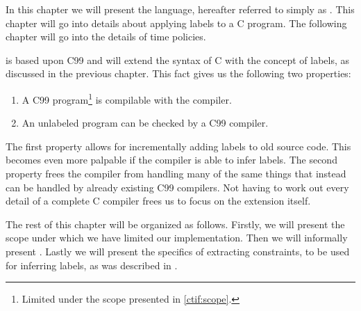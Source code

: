
In this chapter we will present the \thelanglong{} language, hereafter referred to simply as \thelang.
This chapter will go into details about applying labels to a C program.
The following chapter will go into the details of time policies.

\thelang{} is based upon C99 and will extend the syntax of C with the concept of labels, as discussed in the previous chapter.
This fact gives us the following two properties:
\begin{enumerate}
  \item A C99 program\footnote{Limited under the scope presented in \cref{ctif:scope}.} is compilable with the \thelang{} compiler.
  \item An unlabeled \thelang{} program can be checked by a C99 compiler.
\end{enumerate}
The first property allows for incrementally adding labels to old source code.
This becomes even more palpable if the \thelang{} compiler is able to infer labels.
The second property frees the \thelang{} compiler from handling many of the same things that instead can be handled by already existing C99 compilers.
Not having to work out every detail of a complete C compiler frees us to focus on the extension itself.

The rest of this chapter will be organized as follows.
Firstly, we will present the scope under which we have limited our implementation.
Then we will informally present \thelang.
Lastly we will present the specifics of extracting constraints, to be used for inferring labels, as was described in .
